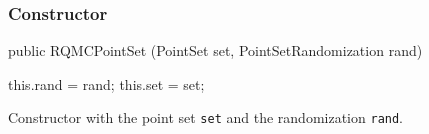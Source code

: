 \subsubsection*{Constructor}
\begin{code}

   public RQMCPointSet (PointSet set, PointSetRandomization rand) \begin{hide} {
      this.rand = rand;
      this.set = set;
   }
   \end{hide}
\end{code}
\begin{tabb}
Constructor with the point set \texttt{set} and the randomization \texttt{rand}.
\end{tabb}
\begin{htmlonly}
\end{htmlonly}

